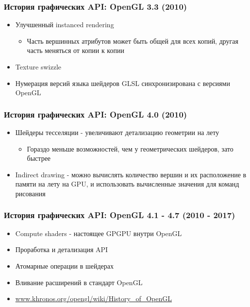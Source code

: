 \documentclass{beamer}
\begin{document}
\begin{frame}
\frametitle{История графических API: OpenGL 3.3 (2010)}
\begin{itemize}
\item Улучшенный instanced rendering
\begin{itemize}
\item Часть вершинных атрибутов может быть общей для всех копий, другая часть меняться от копии к копии
\end{itemize}
\pause
\item Texture swizzle
\pause
\item Нумерация версий языка шейдеров GLSL синхронизирована с версиями OpenGL
\end{itemize}
\end{frame}

\begin{frame}
\frametitle{История графических API: OpenGL 4.0 (2010)}
\begin{itemize}
\item Шейдеры тесселяции - увеличивают детализацию геометрии на лету
\begin{itemize}
\item Гораздо меньше возможностей, чем у геометрических шейдеров, зато быстрее
\end{itemize}
\pause
\item Indirect drawing - можно вычислять количество вершин и их расположение в памяти на лету на GPU, и использовать вычисленные значения для команд рисования
\end{itemize}
\end{frame}

\begin{frame}
\frametitle{История графических API: OpenGL 4.1 - 4.7 (2010 - 2017)}
\begin{itemize}
\item Compute shaders - настоящее GPGPU внутри OpenGL
\item Проработка и детализация API
\item Атомарные операции в шейдерах
\item Вливание расширений в стандарт OpenGL
\item \url{www.khronos.org/opengl/wiki/History_of_OpenGL}
\end{itemize}
\end{frame}
\end{document}

